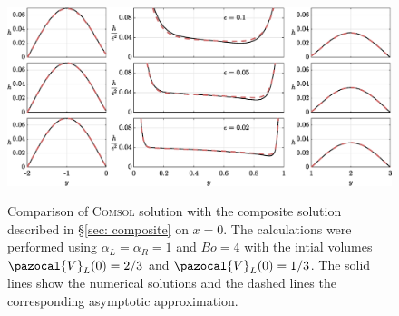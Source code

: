 \documentclass{jfm}
\newcommand{\pD}[3]{\frac{ \partial^{#3} {#1} }{ \partial {#2}^{#3} }}
\begin{document}




\begin{figure} 
\centering
 {\includegraphics[width=1\linewidth]{Figures/Numerical_Validation_V2b.eps}}  
  \caption{
Comparison of \textsc{Comsol}    solution  with the composite solution described  in  \S \ref{sec: composite} on $x=0$.
The calculations were performed using  $\alpha_{L} = \alpha_{R} = 1$ and  $Bo=4$ with the intial volumes  $\pazocal{V}_L(0) = 2/3$  and    $\pazocal{V}_L(0) = 1/3$. 
The solid lines show the numerical solutions     and the dashed lines   the corresponding   asymptotic approximation. 
    } \label{fig: validation 2}
\end{figure}
\end{document}
